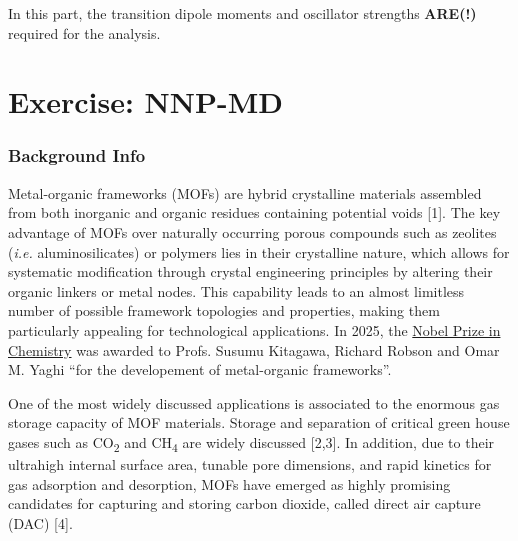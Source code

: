 \documentclass[
  letterpaper,
]{article}
\begin{document}
\begin{tcolorbox}[enhanced jigsaw, toptitle=1mm, opacitybacktitle=0.6, colframe=quarto-callout-note-color-frame, toprule=.15mm, breakable, bottomrule=.15mm, left=2mm, title=\textcolor{quarto-callout-note-color}{\faInfo}\hspace{0.5em}{Note}, titlerule=0mm, leftrule=.75mm, bottomtitle=1mm, coltitle=black, arc=.35mm, rightrule=.15mm, opacityback=0, colback=white, colbacktitle=quarto-callout-note-color!10!white]

In this part, the transition dipole moments and oscillator strengths
\textbf{ARE(!)} required for the analysis.

\end{tcolorbox}

\part{Exercise: NNP-MD}

\hypertarget{background-info-1}{%
\section{Background Info}\label{background-info-1}}

Metal-organic frameworks (MOFs) are hybrid crystalline materials
assembled from both inorganic and organic residues containing potential
voids {[}1{]}. The key advantage of MOFs over naturally occurring porous
compounds such as zeolites (\emph{i.e.} aluminosilicates) or polymers
lies in their crystalline nature, which allows for systematic
modification through crystal engineering principles by altering their
organic linkers or metal nodes. This capability leads to an almost
limitless number of possible framework topologies and properties, making
them particularly appealing for technological applications. In 2025, the
\href{https://www.nobelprize.org/prizes/chemistry/2025/summary/}{Nobel
Prize in Chemistry} was awarded to Profs. Susumu Kitagawa, Richard
Robson and Omar M. Yaghi ``for the developement of metal-organic
frameworks''.

One of the most widely discussed applications is associated to the
enormous gas storage capacity of MOF materials. Storage and separation
of critical green house gases such as CO\textsubscript{2} and
CH\textsubscript{4} are widely discussed {[}2,3{]}. In addition, due to
their ultrahigh internal surface area, tunable pore dimensions, and
rapid kinetics for gas adsorption and desorption, MOFs have emerged as
highly promising candidates for capturing and storing carbon dioxide,
called direct air capture (DAC) {[}4{]}.
\end{document}
